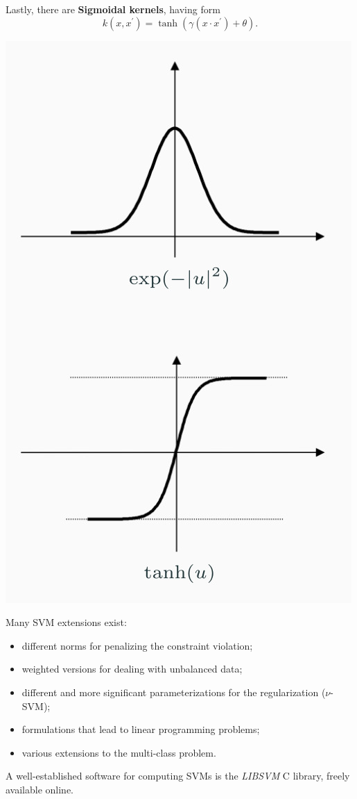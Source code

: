 \documentclass[10pt]{report}
\begin{document}
Lastly, there are \textbf{Sigmoidal kernels}, having form
$$k(x, x^\prime) = \tanh{(\gamma(x\cdot x^\prime) + \theta)}.$$

\begin{center}
\includegraphics[width=.9\linewidth]{./pics/svm/kernel-examples.jpg}
\end{center}

Many SVM extensions exist:
\begin{itemize}
\item different norms for penalizing the constraint violation;
\item weighted versions for dealing with unbalanced data;
\item different and more significant parameterizations for the regularization (\(\nu\)-SVM);
\item formulations that lead to linear programming problems;
\item various extensions to the multi-class problem.
\end{itemize}
A well\--established software for computing SVMs is the \emph{LIBSVM} C library,
freely available online.
\end{document}
